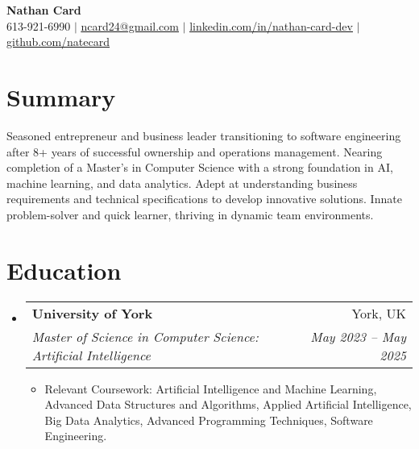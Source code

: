 \documentclass[letterpaper,11pt]{article}
\makeatletter
\newcommand{\resumeItem}[1]{
  \item\small{
    {#1 \vspace{-2pt}}
  }
}
\newcommand{\resumeSubheading}[4]{
  \vspace{-2pt}\item
    \begin{tabular*}{0.97\textwidth}[t]{l@{\extracolsep{\fill}}r}
      \textbf{#1} & #2 \\
      \textit{\small#3} & \textit{\small #4} \\
    \end{tabular*}\vspace{-7pt}
}
\newcommand{\resumeSubHeadingListStart}{\begin{itemize}[leftmargin=0.15in, label={}]}
\newcommand{\resumeSubHeadingListEnd}{\end{itemize}}
\newcommand{\resumeItemListStart}{\begin{itemize}}
\newcommand{\resumeItemListEnd}{\end{itemize}\vspace{-5pt}}
\makeatother
\begin{document}

\begin{center}
    \textbf{\Huge Nathan Card} \\ \vspace{1pt}
    \small 613-921-6990 $|$ \href{mailto:x@x.com}{\underline{ncard24@gmail.com}} $|$ 
    \href{https://linkedin.com/in/nathan-card-dev}{\underline{linkedin.com/in/nathan-card-dev}} $|$
    \href{https://github.com/natecard}{\underline{github.com/natecard}}
\end{center}

\section{Summary}
\begin{itemize}[leftmargin=0.15in, rightmargin=0.15in, label={}]
  \small{\item

  {Seasoned entrepreneur and business leader transitioning to software engineering after 8+ years of successful ownership and operations management.}
  {Nearing completion of a Master's in Computer Science with a strong foundation in AI, machine learning, and data analytics.}
  {Adept at understanding business requirements and technical specifications to develop innovative solutions.}
  {Innate problem-solver and quick learner, thriving in dynamic team environments.}

    }
  \end{itemize}      
    
\section{Education}
  \resumeSubHeadingListStart
    \resumeSubheading
      {University of York}{York, UK}
      {Master of Science in Computer Science: Artificial Intelligence}{May 2023 -- May 2025}
\resumeItemListStart
      \resumeItem{Relevant Coursework: Artificial Intelligence and Machine Learning, Advanced Data Structures and Algorithms, Applied Artificial Intelligence, Big Data Analytics, Advanced Programming Techniques, Software Engineering.}
      \resumeItemListEnd
  \resumeSubHeadingListEnd
\end{document}
